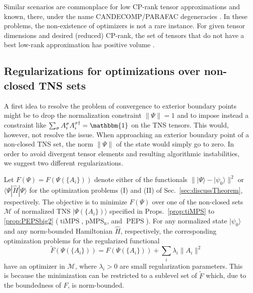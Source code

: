 \documentclass[english,11pt,aps,pra,onecolumn,tightenlines,groupedaddress,superscriptaddress,notitlepage,floatfix,fleqn]{revtex4-1}
\newcommand{\id}{\mathbbm{1}}
\newcommand{\bra}{\langle}
\newcommand{\ket}{\rangle}
\newcommand{\hH}{\hat{H}}
\newcommand{\s}{\sigma}
\newcommand{\mc}[1]{\mathcal{#1}}
\newcommand{\M}{\mc{M}}
\newcommand{\pMPSn}{\operatorname{pMPS_n}}
\newcommand{\tiMPS}{\operatorname{tiMPS}}
\newcommand{\PEPS}{\operatorname{PEPS}}
\begin{document}
Similar scenarios are commonplace for low CP-rank tensor approximations \cite{Hitchcock1927-6,Carroll1970-35,Harshman1970-16} and known, there, under the name CANDECOMP/PARAFAC degeneracies \cite{Paatero2000-14,Stegeman2008-30,Bini1979-8,deSilva2008-30}. In these problems, the non-existence of optimizers is not a rare instance. For given tensor dimensions and desired (reduced) CP-rank, the set of tensors that do not have a best low-rank approximation has positive volume \cite{deSilva2008-30}.

\subsection{Regularizations for optimizations over non-closed TNS sets}
A first idea to resolve the problem of convergence to exterior boundary points might be to drop the normalization constraint $\|\Psi\|=1$ and to impose instead a constraint like $\sum_\s A^\s_i A^{\s\dag}_i=\id$ on the TNS tensors. This would, however, not resolve the issue. When approaching an exterior boundary point of a non-closed TNS set, the norm $\|\Psi\|$ of the state would simply go to zero. 
In order to avoid divergent tensor elements and resulting algorithmic instabilities, we suggest two different regularizations.

Let $F(\Psi)=F(\Psi(\{A_i\}))$ denote either of the functionals $\||\Psi\ket-|\psi_0\ket\|^2$ or $\bra\Psi|\hH|\Psi\ket$ for the optimization problems (I) and (II) of Sec.~\ref{sec:discussTheorem}, respectively. The objective is to minimize $F(\Psi)$ over one of the non-closed sets $\M$ of normalized TNS $|\Psi(\{A_i\})\ket$ specified in Props.~\ref{prop:tiMPS} to \ref{prop:PEPSbig2} ($\tiMPS$, $\pMPSn$, and $\PEPS$). For any normalized state $|\psi_0\ket$ and any norm-bounded Hamiltonian $\hH$, respectively, the corresponding optimization problems for the regularized functional
\begin{equation}\label{eq:regularize1}\textstyle
	\tilde{F}(\Psi(\{A_i\})) = F(\Psi(\{A_i\}))+\sum_i\lambda_i \|A_i\|^2
\end{equation}
have an optimizer in $\M$, where $\lambda_i>0$ are small regularization parameters.
This is because the minimization can be restricted to a sublevel set of $\tilde{F}$ which, due to the boundedness of $F$, is norm-bounded.
\end{document}
